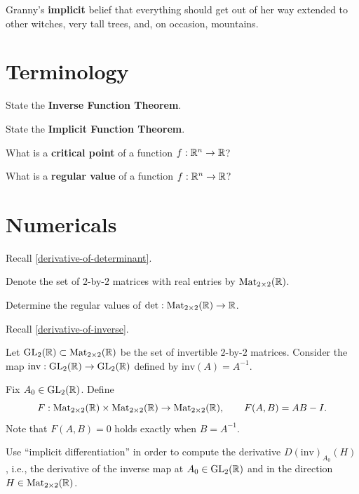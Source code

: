 \documentclass{homework}
\author{Jim Fowler}
\newcommand{\Mtwo}{\mathrm{Mat}_{2 \times 2}}
\newcommand{\GL}{\mathrm{GL}}
\begin{document}
\maketitle

\begin{inspiration}
Granny's \textbf{implicit} belief that everything should get out of her way extended to other witches, very tall trees, and, on occasion, mountains. \\
\end{inspiration}

\section{Terminology}

\begin{problem}
State the \textbf{Inverse Function Theorem}.
\end{problem}

\begin{problem}
State the \textbf{Implicit Function Theorem}.
\end{problem}

\begin{problem}
  What is a \textbf{critical point} of a function $f : \mathbb{R}^n \to \mathbb{R}$?
\end{problem}

\begin{problem}\label{regular-value-n-to-one}%
  What is a \textbf{regular value} of a function $f : \mathbb{R}^n \to \mathbb{R}$?
\end{problem}

\section{Numericals}

\begin{problem}
  Recall \ref{derivative-of-determinant}.

  Denote the set of $2$-by-$2$ matrices with real entries by $\Mtwo(\R)$.

  Determine the regular values of $\det : \Mtwo(\R) \to \R$.
\end{problem}
  
\begin{problem}
  Recall \ref{derivative-of-inverse}.
  
Let $\GL_2(\R)\subset \Mtwo(\R)$ be the set of invertible $2$-by-$2$ matrices. Consider the map
$\mathrm{inv}:\GL_2(\R)\to \GL_2(\R)$ defined by $\mathrm{inv}(A)=A^{-1}$.

Fix $A_0\in \GL_2(\R)$.  Define
\[
F:\Mtwo(\R)\times \Mtwo(\R)\to \Mtwo(\R),\qquad F(A,B)=AB-I.
\]
Note that $F(A,B)=0$ holds exactly when $B=A^{-1}$.

Use ``implicit differentiation'' in order to compute
the derivative $D(\mathrm{inv})_{A_0}(H)$, i.e., the derivative of the inverse map at $A_0 \in \GL_2(\R)$ and in the direction $H\in \Mtwo(\R)$.
\end{problem}
\end{document}
